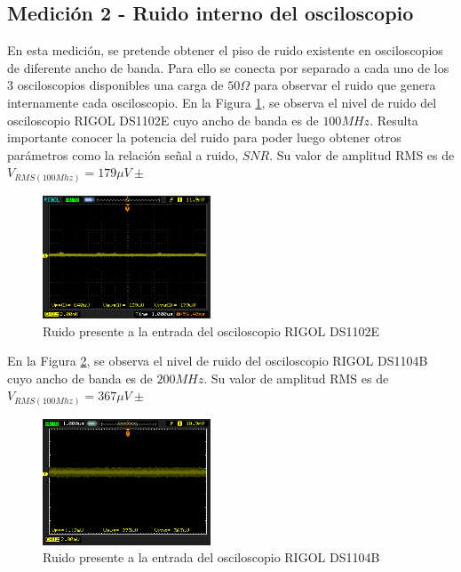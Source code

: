 \documentclass[a4paper,10pt]{article}
\begin{document}
	\subsection{Medición 2 - Ruido interno del osciloscopio}
	En esta medici\'on, se pretende obtener el piso de ruido existente en osciloscopios de diferente ancho de banda. Para ello se conecta por separado a cada uno de los 3 osciloscopios disponibles una carga de $50\Omega$ para observar el ruido que genera internamente cada osciloscopio.
	En la Figura \ref{img005}, se observa el nivel de ruido del osciloscopio RIGOL DS1102E cuyo ancho de banda es de $100MHz$. Resulta importante conocer la potencia del ruido para poder luego obtener otros par\'ametros como la relaci\'on se\~nal a ruido, $SNR$.
	Su valor de amplitud RMS es de $V_{RMS(100Mhz)}=179\mu V \pm$
		\begin{figure}[!htb]
			\centering
			\includegraphics[width=5cm]
			{Imagenes/Ruido100Mhz.png}
			\caption{Ruido presente a la entrada del osciloscopio RIGOL DS1102E}
			\label{img005}
		\end{figure}
		
	En la Figura \ref{img006}, se observa el nivel de ruido del osciloscopio RIGOL DS1104B cuyo ancho de banda es de $200MHz$.
	Su valor de amplitud RMS es de $V_{RMS(100Mhz)}=367\mu V \pm$		
		\begin{figure}[!htb]
			\centering
			\includegraphics[width=5cm]
			{Imagenes/Ruido200Mhz.png}
			\caption{Ruido presente a la entrada del osciloscopio RIGOL DS1104B}
			\label{img006}
		\end{figure}
		
\end{document}
